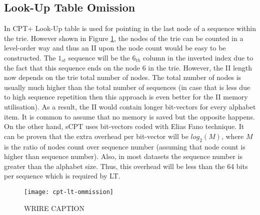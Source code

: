 \subsection{Look-Up Table Omission}
In CPT+ Look-Up table is used for pointing in the last node of a sequence within the trie. However shown in Figure \ref{fig:LT-ommission}, the nodes of the trie can be counted in a level-order way and thus an II upon the node count would be easy to be constructed. The $1_{st}$ sequence will be the $6_{th}$ column in the inverted index due to the fact that this sequence ends on the node 6 in the trie. However, the II length now depends on the trie total number of nodes. The total number of nodes is usually much higher than the total number of sequences (in case that is less due to high sequence repetition then this approach is even better for the II memory utilisation). As a result, the II would contain longer bit-vectors for every alphabet item. It is common to assume that no memory is saved but the opposite happens. On the other hand, sCPT uses bit-vectors coded with Elias Fano technique. It can be proven that the extra overhead per bit-vector will be $log_2(M)$, where $M$ is the ratio of nodes count over sequence number (assuming that node count is higher than sequence number). Also, in most datasets the sequence number is greater than the alphabet size. Thus, this overhead will be less than the 64 bits per sequence which is required by LT. 

\begin{figure}[h]
    \centering
    \texttt{[image: cpt-lt-ommission]}
    \caption{WRIRE CAPTION}
    \label{fig:LT-ommission}
\end{figure}

